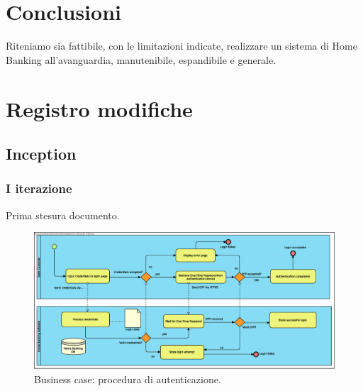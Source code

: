 \documentclass[10pt]{softeng} %
\begin{document}

\section{Conclusioni}

Riteniamo sia fattibile, con le limitazioni indicate, realizzare un sistema di Home Banking all'avanguardia, manutenibile, espandibile e generale.


\section{Registro modifiche}

\subsection{Inception}

\subsubsection{I iterazione}

Prima stesura documento.


\printcustombibsmall{}


\begin{figure}[hbt]
	\centering
	\includegraphics[width=\textheight, angle=90]{Images/Authentication.eps}
	\caption{Business case: procedura di autenticazione.}
	\label{fig:business_case_authentication}
\end{figure}
\end{document}
